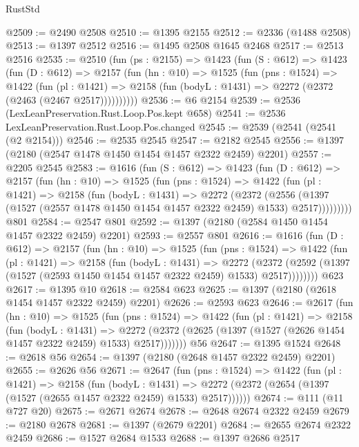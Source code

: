 \begin{lexlean}{RustStd}
\begin{coremodule}
@2509 := @2490 @2508
@2510 := @1395 @2155
@2512 := @2336 (@1488 @2508)
@2513 := @1397 @2512
@2516 := @1495 @2508 @1645 @2468
@2517 := @2513 @2516
@2535 := @2510
    (fun (ps : @2155) =>
    @1423
      (fun (S : @612) =>
      @1423
        (fun (D : @612) =>
        @2157
          (fun (hn : @10) =>
          @1525
            (fun (pns : @1524) =>
            @1422
              (fun (pl : @1421) =>
              @2158 (fun (bodyL : @1431) => @2272 (@2372 (@2463 (@2467 @2517))))))))))
@2536 := @6 @2154
@2539 := @2536 (LexLeanPreservation.Rust.Loop.Pos.kept @658)
@2541 := @2536 LexLeanPreservation.Rust.Loop.Pos.changed
@2545 := @2539 (@2541 (@2541 (@2 @2154)))
@2546 := @2535 @2545
@2547 := @2182 @2545
@2556 := @1397 (@2180 (@2547 @1478 @1450 @1454 @1457 @2322 @2459) @2201)
@2557 := @2205 @2545
@2583 := @1616
    (fun (S : @612) =>
    @1423
      (fun (D : @612) =>
      @2157
        (fun (hn : @10) =>
        @1525
          (fun (pns : @1524) =>
          @1422
            (fun (pl : @1421) =>
            @2158
              (fun (bodyL : @1431) =>
              @2272
                (@2372
                  (@2556
                    (@1397 (@1527 (@2557 @1478 @1450 @1454 @1457 @2322 @2459) @1533) @2517)))))))))
    @801
@2584 := @2547 @801
@2592 := @1397 (@2180 (@2584 @1450 @1454 @1457 @2322 @2459) @2201)
@2593 := @2557 @801
@2616 := @1616
    (fun (D : @612) =>
    @2157
      (fun (hn : @10) =>
      @1525
        (fun (pns : @1524) =>
        @1422
          (fun (pl : @1421) =>
          @2158
            (fun (bodyL : @1431) =>
            @2272
              (@2372 (@2592 (@1397 (@1527 (@2593 @1450 @1454 @1457 @2322 @2459) @1533) @2517))))))))
    @623
@2617 := @1395 @10
@2618 := @2584 @623
@2625 := @1397 (@2180 (@2618 @1454 @1457 @2322 @2459) @2201)
@2626 := @2593 @623
@2646 := @2617
    (fun (hn : @10) =>
    @1525
      (fun (pns : @1524) =>
      @1422
        (fun (pl : @1421) =>
        @2158
          (fun (bodyL : @1431) =>
          @2272 (@2372 (@2625 (@1397 (@1527 (@2626 @1454 @1457 @2322 @2459) @1533) @2517)))))))
    @56
@2647 := @1395 @1524
@2648 := @2618 @56
@2654 := @1397 (@2180 (@2648 @1457 @2322 @2459) @2201)
@2655 := @2626 @56
@2671 := @2647
    (fun (pns : @1524) =>
    @1422
      (fun (pl : @1421) =>
      @2158
        (fun (bodyL : @1431) =>
        @2272 (@2372 (@2654 (@1397 (@1527 (@2655 @1457 @2322 @2459) @1533) @2517))))))
@2674 := @111 (@11 @727 @20)
@2675 := @2671 @2674
@2678 := @2648 @2674 @2322 @2459
@2679 := @2180 @2678
@2681 := @1397 (@2679 @2201)
@2684 := @2655 @2674 @2322 @2459
@2686 := @1527 @2684 @1533
@2688 := @1397 @2686 @2517

\end{coremodule}
\end{lexlean}
